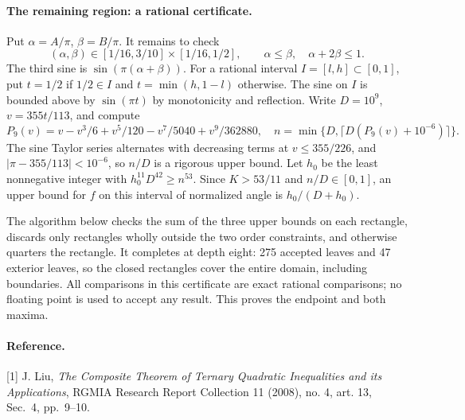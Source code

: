 \documentclass[11pt,a4paper]{article}
\numberwithin{equation}{section}
\theoremstyle{definition}
\theoremstyle{remark}
\begin{document}
\paragraph{The remaining region: a rational certificate.}
Put $\alpha=A/\pi$, $\beta=B/\pi$. It remains to check
\[
 (\alpha,\beta)\in[1/16,3/10]\times[1/16,1/2],\qquad
 \alpha\le\beta,\quad \alpha+2\beta\le1.
\]
The third sine is $\sin(\pi(\alpha+\beta))$. For a rational interval $I=[l,h]\subset[0,1]$, put $t=1/2$ if $1/2\in I$ and $t=\min(h,1-l)$ otherwise. The sine on $I$ is bounded above by $\sin(\pi t)$ by monotonicity and reflection. Write $D=10^9$, $v=355t/113$, and compute
\[
 P_9(v)=v-v^3/6+v^5/120-v^7/5040+v^9/362880,\quad
 n=\min\{D,\lceil D(P_9(v)+10^{-6})\rceil\}.
\]
The sine Taylor series alternates with decreasing terms at $v\le 355/226$, and $|\pi-355/113|<10^{-6}$, so $n/D$ is a rigorous upper bound. Let $h_0$ be the least nonnegative integer with
$h_0^{11}D^{42}\ge n^{53}$. Since $K>53/11$ and $n/D\in[0,1]$, an upper bound for $f$ on this interval of normalized angle is $h_0/(D+h_0)$.

The algorithm below checks the sum of the three upper bounds on each rectangle, discards only rectangles wholly outside the two order constraints, and otherwise quarters the rectangle. It completes at depth eight: 275 accepted leaves and 47 exterior leaves, so the closed rectangles cover the entire domain, including boundaries. All comparisons in this certificate are exact rational comparisons; no floating point is used to accept any result. This proves the endpoint and both maxima.

\paragraph{Reference.} [1] J. Liu, \emph{The Composite Theorem of Ternary Quadratic Inequalities and its Applications}, RGMIA Research Report Collection 11 (2008), no. 4, art. 13, Sec.~4, pp.~9--10.
\end{document}
